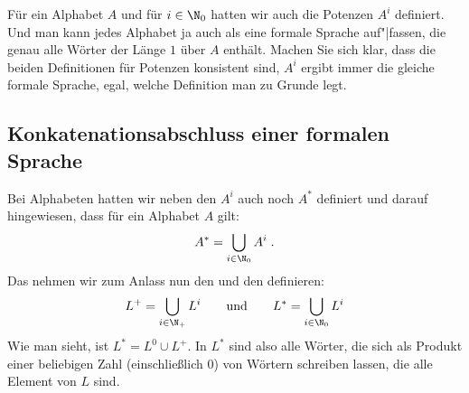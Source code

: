 Für ein Alphabet $A$ und für $i\in\N_0$ hatten wir auch die Potenzen $A^i$
definiert.  
%
Und man kann jedes Alphabet ja auch als eine formale Sprache auf"|fassen, die
genau alle Wörter der Länge $1$ über $A$ enthält.
%
Machen Sie sich klar, dass die beiden Definitionen für Potenzen konsistent
sind, \dh $A^i$ 
ergibt immer die gleiche formale Sprache, egal, welche Definition man zu
Grunde legt.
      
\Tut\subsection{Konkatenationsabschluss einer formalen Sprache}

Bei Alphabeten hatten wir neben den $A^i$ auch noch $A^*$ definiert und darauf
hingewiesen, dass für ein Alphabet $A$ gilt:
\[
A^* =\bigcup_{i\in\N_0} A^i \;.
\]
Das nehmen wir zum Anlass nun den  und den %
%
 definieren:
%
\begin{equation*}
  L^+ = \bigcup_{i\in\N_+} L^i \text{\qquad und\qquad}
  L^* = \bigcup_{i\in\N_0} L^i
\end{equation*}
% 
Wie man sieht, ist $L^*=L^0\cup L^+$. In $L^*$ sind also alle Wörter, die sich
als Produkt einer beliebigen Zahl (einschließlich $0$) von Wörtern schreiben
lassen, die alle Element von $L$ sind.
%

